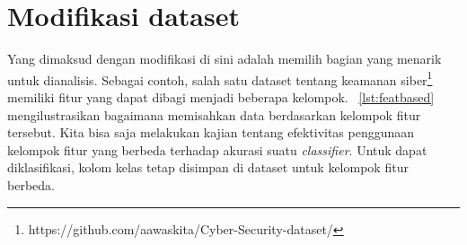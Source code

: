 

\section{Modifikasi dataset}
Yang dimaksud dengan modifikasi di sini adalah memilih bagian yang menarik untuk dianalisis. Sebagai contoh, salah satu dataset tentang keamanan siber\footnote{https://github.com/aawaskita/Cyber-Security-dataset/} memiliki fitur yang dapat dibagi menjadi beberapa kelompok. \lstlistingname~\ref{lst:featbased} mengilustrasikan bagaimana memisahkan data berdasarkan kelompok fitur tersebut. Kita bisa saja melakukan kajian tentang efektivitas penggunaan kelompok fitur yang berbeda terhadap akurasi suatu \textit{classifier}. Untuk dapat diklasifikasi, kolom kelas tetap disimpan di dataset untuk kelompok fitur berbeda.



